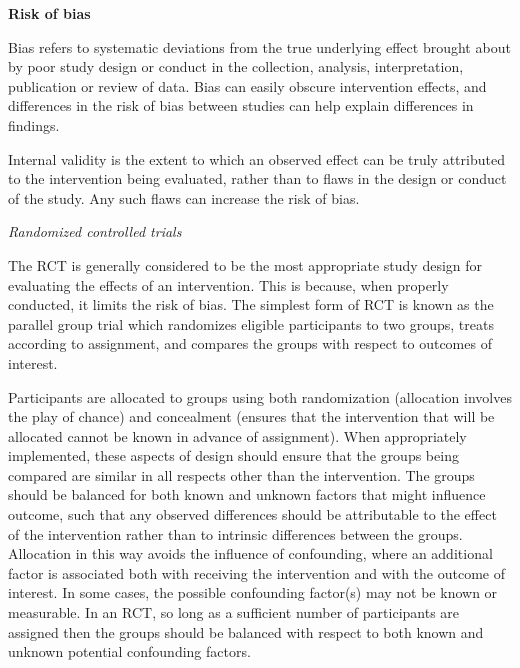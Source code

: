 \documentclass[
  10pt,
  a4paper,
  DIV=11,
  numbers=noendperiod]{scrreprt}
\begin{document}
\textbf{Risk of bias}

Bias refers to systematic deviations from the true underlying effect
brought about by poor study design or conduct in the collection,
analysis, interpretation, publication or review of data. Bias can easily
obscure intervention effects, and differences in the risk of bias
between studies can help explain differences in findings.

Internal validity is the extent to which an observed effect can be truly
attributed to the intervention being evaluated, rather than to flaws in
the design or conduct of the study. Any such flaws can increase the risk
of bias.

\emph{Randomized controlled trials}

The RCT is generally considered to be the most appropriate study design
for evaluating the effects of an intervention. This is because, when
properly conducted, it limits the risk of bias. The simplest form of RCT
is known as the parallel group trial which randomizes eligible
participants to two groups, treats according to assignment, and compares
the groups with respect to outcomes of interest.

Participants are allocated to groups using both randomization
(allocation involves the play of chance) and concealment (ensures that
the intervention that will be allocated cannot be known in advance of
assignment). When appropriately implemented, these aspects of design
should ensure that the groups being compared are similar in all respects
other than the intervention. The groups should be balanced for both
known and unknown factors that might influence outcome, such that any
observed differences should be attributable to the effect of the
intervention rather than to intrinsic differences between the groups.
Allocation in this way avoids the influence of confounding, where an
additional factor is associated both with receiving the intervention and
with the outcome of interest. In some cases, the possible confounding
factor(s) may not be known or measurable. In an RCT, so long as a
sufficient number of participants are assigned then the groups should be
balanced with respect to both known and unknown potential confounding
factors.
\end{document}
